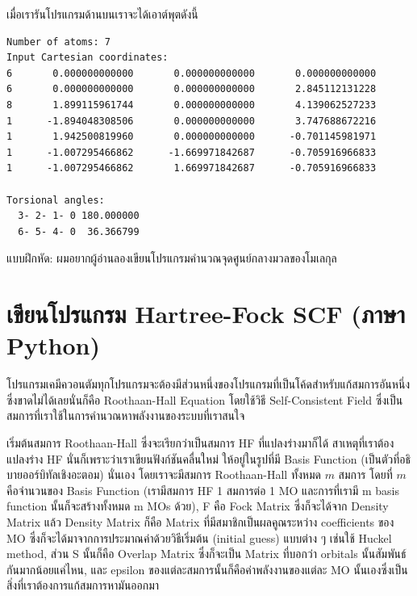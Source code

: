 \vspace{5pt}

\noindent เมื่อเรารันโปรแกรมด้านบนเราจะได้เอาต์พุตดังนี้

\vspace{5pt}

\begin{lstlisting}[style=MyC++]
Number of atoms: 7
Input Cartesian coordinates:
6       0.000000000000       0.000000000000       0.000000000000
6       0.000000000000       0.000000000000       2.845112131228
8       1.899115961744       0.000000000000       4.139062527233
1      -1.894048308506       0.000000000000       3.747688672216
1       1.942500819960       0.000000000000      -0.701145981971
1      -1.007295466862      -1.669971842687      -0.705916966833
1      -1.007295466862       1.669971842687      -0.705916966833

Torsional angles:
  3- 2- 1- 0 180.000000
  6- 5- 4- 0  36.366799  
\end{lstlisting}

\vspace{5pt}

\noindent {}

\noindent แบบฝึกหัด: ผมอยากผู้อ่านลองเขียนโปรแกรมคำนวณจุดศูนย์กลางมวลของโมเลกุล

\vspace{5pt}

\section{เขียนโปรแกรม Hartree-Fock SCF (ภาษา Python)}

โปรแกรมเคมีควอนตัมทุกโปรแกรมจะต้องมีส่วนหนึ่งของโปรแกรมที่เป็นโค้ดสำหรับแก้สมการอันหนึ่งซึ่งขาดไม่ได้เลยนั่นก็คือ Roothaan-Hall Equation
โดยใช้วิธี Self-Consistent Field ซึ่งเป็นสมการที่เราใช้ในการคำนวณหาพลังงานของระบบที่เราสนใจ

เริ่มต้นสมการ Roothaan-Hall ซึ่งจะเรียกว่าเป็นสมการ HF ที่แปลงร่างมาก็ได้ สาเหตุที่เราต้องแปลงร่าง HF นั่นก็เพราะว่าเราเขียนฟังก์ชันคลื่นใหม่%
ให้อยู่ในรูปที่มี Basis Function (เป็นตัวที่อธิบายออร์บิทัลเชิงอะตอม) นั่นเอง โดยเราจะมีสมการ Roothaan-Hall ทั้งหมด $m$ สมการ โดยที่ $m$
คือจำนวนของ Basis Function (เรามีสมการ HF 1 สมการต่อ 1 MO และการที่เรามี m basis function นั้นก็จะสร้างทั้งหมด m MOs ด้วย),
F คือ Fock Matrix ซึ่งก็จะได้จาก Density Matrix แล้ว Density Matrix ก็คือ Matrix ที่มีสมาชิกเป็นผลคูณระหว่าง coefficients ของ
MO ซึ่งก็จะได้มาจากการประมาณค่าด้วยวิธีเริ่มต้น (initial guess) แบบต่าง ๆ เช่นใช้ Huckel method, ส่วน S นั้นก็คือ Overlap Matrix
ซึ่งก็จะเป็น Matrix ที่บอกว่า orbitals นั้นสัมพันธ์กันมากน้อยแค่ไหน, และ epsilon ของแต่ละสมการนั้นก็คือค่าพลังงานของแต่ละ MO
นั้นเองซึ่งเป็นสิ่งที่เราต้องการแก้สมการหามันออกมา

